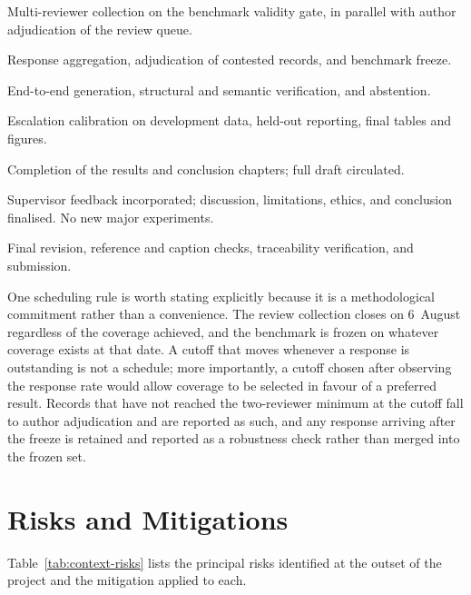 \begin{description}[style=multiline,leftmargin=3.9cm,labelwidth=3.3cm]
  \item[25 July -- 6 August] Multi-reviewer collection on the benchmark validity gate, in parallel with author adjudication of the review queue.
  \item[6 -- 7 August] Response aggregation, adjudication of contested records, and benchmark freeze.
  \item[7 -- 10 August] End-to-end generation, structural and semantic verification, and abstention.
  \item[10 -- 11 August] Escalation calibration on development data, held-out reporting, final tables and figures.
  \item[11 -- 12 August] Completion of the results and conclusion chapters; full draft circulated.
  \item[13 -- 25 August] Supervisor feedback incorporated; discussion, limitations, ethics, and conclusion finalised. No new major experiments.
  \item[26 -- 31 August] Final revision, reference and caption checks, traceability verification, and submission.
\end{description}

One scheduling rule is worth stating explicitly because it is a methodological commitment rather than a convenience. The review collection closes on 6~August regardless of the coverage achieved, and the benchmark is frozen on whatever coverage exists at that date. A cutoff that moves whenever a response is outstanding is not a schedule; more importantly, a cutoff chosen after observing the response rate would allow coverage to be selected in favour of a preferred result. Records that have not reached the two-reviewer minimum at the cutoff fall to author adjudication and are reported as such, and any response arriving after the freeze is retained and reported as a robustness check rather than merged into the frozen set.

\section{Risks and Mitigations}
\label{sec:context-risks}

Table~\ref{tab:context-risks} lists the principal risks identified at the outset of the project and the mitigation applied to each.

